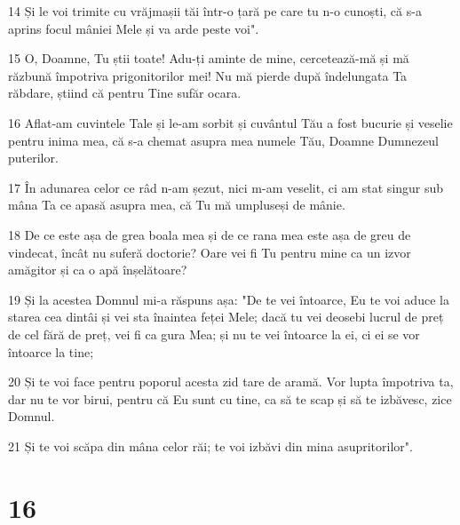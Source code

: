 \par 14 Și le voi trimite cu vrăjmașii tăi într-o țară pe care tu n-o cunoști, că s-a aprins focul mâniei Mele și va arde peste voi".
\par 15 O, Doamne, Tu știi toate! Adu-ți aminte de mine, cercetează-mă și mă răzbună împotriva prigonitorilor mei! Nu mă pierde după îndelungata Ta răbdare, știind că pentru Tine sufăr ocara.
\par 16 Aflat-am cuvintele Tale și le-am sorbit și cuvântul Tău a fost bucurie și veselie pentru inima mea, că s-a chemat asupra mea numele Tău, Doamne Dumnezeul puterilor.
\par 17 În adunarea celor ce râd n-am șezut, nici m-am veselit, ci am stat singur sub mâna Ta ce apasă asupra mea, că Tu mă umpluseși de mânie.
\par 18 De ce este așa de grea boala mea și de ce rana mea este așa de greu de vindecat, încât nu suferă doctorie? Oare vei fi Tu pentru mine ca un izvor amăgitor și ca o apă înșelătoare?
\par 19 Și la acestea Domnul mi-a răspuns așa: "De te vei întoarce, Eu te voi aduce la starea cea dintâi și vei sta înaintea feței Mele; dacă tu vei deosebi lucrul de preț de cel fără de preț, vei fi ca gura Mea; și nu te vei întoarce la ei, ci ei se vor întoarce la tine;
\par 20 Și te voi face pentru poporul acesta zid tare de aramă. Vor lupta împotriva ta, dar nu te vor birui, pentru că Eu sunt cu tine, ca să te scap și să te izbăvesc, zice Domnul.
\par 21 Și te voi scăpa din mâna celor răi; te voi izbăvi din mina asupritorilor".

\chapter{16}


